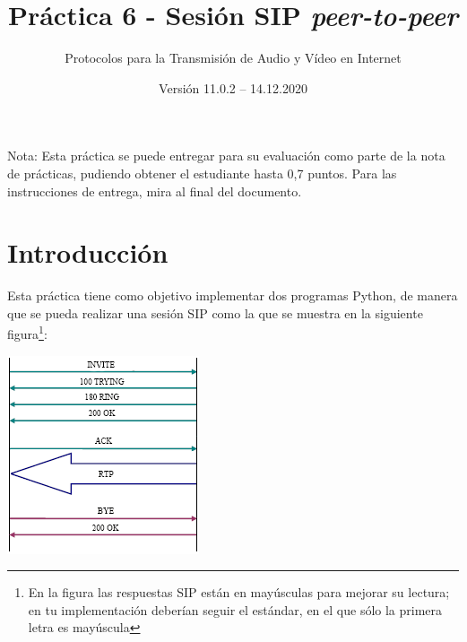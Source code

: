 \documentclass[a4paper,11pt]{article}
\begin{document}
\title{Práctica 6 - Sesión SIP \emph{peer-to-peer}}
\author{Protocolos para la Transmisión de Audio y Vídeo en Internet}
\date{Versión 11.0.2 -- 14.12.2020}



\maketitle
\thispagestyle{empty}



Nota: Esta práctica se puede entregar para su evaluación como parte de la nota de prácticas, pudiendo obtener el estudiante hasta 0,7 puntos. Para las instrucciones de entrega, mira al final del documento.

\section*{Introducción}

Esta práctica tiene como objetivo implementar dos programas Python,
de manera que se pueda realizar una sesión SIP como la que se
muestra en la siguiente figura\footnote{En la figura las respuestas SIP están en 
mayúsculas para mejorar su lectura; en tu implementación deberían seguir el 
estándar, en el que sólo la primera letra es mayúscula}:

\begin{center}
\includegraphics{figs/sip-invite.png}
\end{center}
\end{document}
